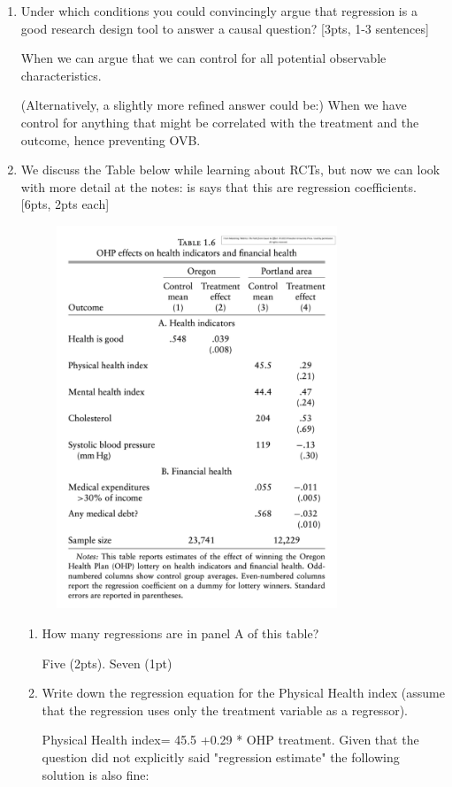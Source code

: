 \documentclass[answers]{exam}
\begin{document}
\begin{enumerate}
 
  \item Under which conditions you could convincingly argue that regression is a good research design tool to answer a causal question? [3pts, 1-3 sentences]
\begin{solution}
    When we can argue that we can control for all potential observable characteristics. 
    
    (Alternatively, a slightly more refined answer could be:) When we have control for anything that might be correlated with the treatment and the outcome, hence preventing OVB. 
    \end{solution}

 \item We discuss the Table below while learning about RCTs, but now we can look with more detail at the notes: is says that this are regression coefficients. [6pts, 2pts each]
 \begin{figure}[H]
    \centering
    \includegraphics[width=3.3in]{Figures/midterm2_table1.png}
    \label{}
\end{figure}
 \begin{enumerate}
     \item How many regressions are in panel A of this table? 
    \begin{solution}
    Five (2pts). Seven (1pt) 
    \end{solution}
     \item Write down the regression equation for the Physical Health index (assume that the regression uses only the treatment variable as a regressor).
    \begin{solution}
    Physical Health index= 45.5 +0.29 * OHP treatment. 
    Given that the question did not explicitly said "regression estimate" the following solution is also fine:
    

\end{solution}
\end{enumerate}
\end{enumerate}
\end{document}
